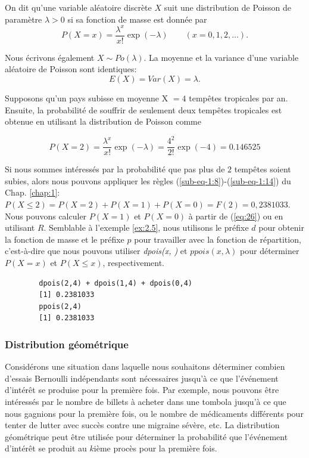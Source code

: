 {\theoremstyle{definition}
\begin{definition}
    On dit qu'une variable aléatoire discrète $ X $ suit une distribution de Poisson de paramètre
    $ \lambda> 0 $ si sa fonction de masse est donnée par
    \begin{equation}\label{eq:26}
        P(X=x)=\frac{\lambda^x}{x!}\exp(-\lambda) \quad\mathrm{    }\quad   (x=0,1,2,\dots).
    \end{equation}
\end{definition}
Nous écrivons également $ X \sim Po(\lambda) $. La moyenne et la variance d'une variable aléatoire de Poisson
sont identiques:
$$E(X)=Var(X)=\lambda.$$

\begin{example}
    Supposons qu'un pays subisse en moyenne X $ = 4 $ tempêtes tropicales par an. Ensuite, la probabilité de
    souffrir de seulement deux tempêtes tropicales est obtenue en utilisant la distribution de Poisson comme

    $$P(X=2)=\frac{\lambda^x}{x!}\exp(-\lambda)=\frac{4^2}{2!}\exp(-4)=0.146525$$

    Si nous sommes intéressés par la probabilité que pas plus de $2$ tempêtes soient subies, alors nous pouvons
    appliquer les règles (\ref{sub-eq-1:8})-(\ref{sub-eq-1:14}) du Chap. \ref{chap:1}:
    $P (X \leq 2) = P (X = 2) + P (X = 1) + P (X = 0) = F (2) = 0,2381033$.
    Nous pouvons calculer $P (X = 1)$ et $P (X = 0)$ à partir de (\ref{eq:26}) ou en utilisant $R$. Semblable à
    l'exemple \ref{ex:2.5}, nous utilisons le préfixe $d$ pour obtenir la fonction de masse  et le préfixe $p$
    pour travailler avec la fonction de répartition, c'est-à-dire que nous pouvons utiliser \emph{dpois(x, \lambda)}
    et $  ppois(x, \lambda)$
    pour déterminer $P (X = x)$ et $P(X \leq x)$, respectivement.

    \begin{verbatim}
        dpois(2,4) + dpois(1,4) + dpois(0,4)
        [1] 0.2381033
        ppois(2,4)
        [1] 0.2381033
    \end{verbatim}
\end{example}

\subsubsection{Distribution géométrique}

Considérons une situation dans laquelle nous souhaitons déterminer combien d'essais Bernoulli indépendants sont
nécessaires jusqu'à ce que l'événement d'intérêt se produise pour la première fois. Par exemple, nous pouvons être
intéressés par le nombre de billets à acheter dans une tombola jusqu'à ce que nous gagnions pour la première fois, ou
le nombre de médicaments différents pour tenter de lutter avec succès contre une migraine sévère, etc. La distribution
géométrique peut être utilisée pour déterminer la probabilité que l'événement d'intérêt se produit au $k$ième procès
pour la première fois.

}
